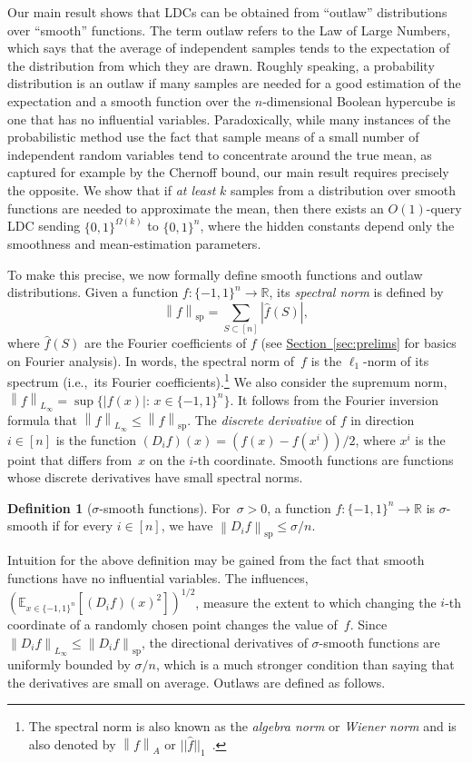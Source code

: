 \documentclass[11pt]{article}
\numberwithin{equation}{section}
\theoremstyle{definition}
\newtheorem{definition}[theorem]{Definition}
\theoremstyle{plain}
\newcommand{\R}{\mathbb R}
\newcommand{\expref}[2]{\hyperref[#2]{#1~\ref{#2}}}
\newcommand{\bset}[1]{\{0,1\}^{#1}} %
\newcommand{\pmset}[1]{\{-1,1\}^{#1}} %
\newcommand{\sBC}{{\{-1,1\}}}
\newcommand{\Exp}{{\mathbb{E}}}
\newcommand{\specnorm}[1]{\left\lVert #1 \right\rVert_{\mathrm{sp}}}
\newcommand{\norm}[1]{\left\lVert #1\right\rVert}
\newcommand{\st}{:\,} %
\begin{document}
Our main result shows that LDCs can be obtained from ``outlaw'' distributions over ``smooth'' functions.
The term outlaw refers to the Law of Large Numbers, which says that the average of independent samples tends to the expectation of the distribution from which they are drawn.
Roughly speaking, a probability distribution is an outlaw if many samples are needed for  a good estimation of the expectation
and
a smooth function over the $n$-dimensional Boolean hypercube is one that has no influential variables.
Paradoxically, while many instances of the probabilistic method use the fact that sample means of a small number of independent random variables tend to concentrate around the true mean, as captured for example by the Chernoff bound, our main result requires precisely the opposite. 
We show that if \emph{at least} $k$ samples from a distribution over smooth functions are needed to approximate the mean, then there exists an $O(1)$-query LDC sending $\bset{\Omega(k)}$ to $\bset{n}$, where the hidden constants depend only the smoothness and mean-estimation parameters.

To make this precise, we now formally define smooth functions and outlaw distributions. 
Given a function $f:\pmset{n}\to \R$, its \emph{spectral norm} is defined by
$$
\specnorm{f} =\sum_{S\subset [n]}|\widehat{f}(S)|,
$$
where $\widehat{f}(S)$ are the Fourier coefficients of $f$ (see \expref{Section}{sec:prelims} for basics on Fourier analysis). In words, the spectral norm of~$f$ is the $\ell_1$-norm of its spectrum (i.e.,\ its Fourier coefficients).\footnote{ 
The spectral norm is also known as the \emph{algebra norm} or \emph{Wiener norm} and is also denoted by $\norm{f}_A$ or $||\hat{f}||_{1}$~\cite{GreenSanders:2008,ShpilkaTV17}.}
We also consider the supremum norm, $\norm{f}_{L_\infty}=\sup\{|f(x)| \st x\in \pmset{n}\}$.
It follows from the Fourier inversion formula that $\norm{f}_{L_\infty}\le \specnorm{f}$. The \emph{discrete derivative} of $f$ in direction~$i\in[n]$ is the function $(D_if)(x) = (f(x) - f(x^i))/2$, where $x^i$ is the point that differs from~$x$ on the $i$-th %
coordinate. 
Smooth functions are functions whose discrete derivatives have small spectral norms.

\begin{definition}[$\sigma$-smooth functions]
For~$\sigma>0$, a function $f:\sBC^n\to \R$ is $\sigma$-smooth if for every $i\in [n]$, we have $\specnorm{D_if}\le \sigma/n$.
\end{definition}

Intuition for the above definition may be gained from the fact that smooth functions have no influential variables.
The influences, $(\Exp_{x\in\pmset{n}}[(D_if)(x)^2])^{1/2}$, measure the extent to which changing the $i$-th %
coordinate of a randomly chosen point changes the value of~$f$. Since $\norm{D_if}_{L_\infty}\le \specnorm{D_if}$, the directional derivatives of $\sigma$-smooth functions are uniformly bounded by $\sigma/n$, which is a much stronger condition than saying that the derivatives are small on average.
Outlaws are defined as follows.
\end{document}
